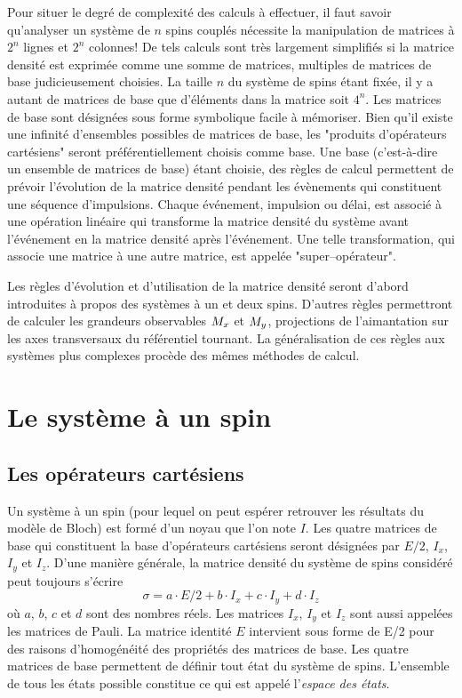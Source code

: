 Pour situer le degré de complexité des calculs à effectuer, il faut savoir qu'analyser un 
système de $n$ spins couplés nécessite la manipulation de matrices à $2^n$ lignes et $2^n$ 
colonnes! 
De tels calculs sont très largement simplifiés si la matrice densité est 
exprimée comme une somme de matrices, multiples de matrices de base judicieusement 
choisies. 
La taille $n$ du système de spins étant fixée, il y a autant
de matrices de base que d'éléments dans la matrice soit $4^n$. 
Les matrices de base sont désignées sous forme symbolique facile à mémoriser. 
Bien qu'il existe une infinité d'ensembles possibles de matrices de base,
les "produits d'opérateurs cartésiens" seront préférentiellement choisis comme base.
Une base (c'est-à-dire un ensemble de matrices de base) étant choisie, 
des règles de calcul permettent de prévoir l'évolution de la 
matrice densité pendant les évènements qui constituent une séquence d'impulsions.
Chaque événement, impulsion ou délai, est associé à une opération linéaire
qui transforme la matrice densité du système avant l'événement en la matrice densité
après l'événement.
Une telle transformation, qui associe une matrice à une autre matrice, 
est appelée "super--opérateur".

Les règles d'évolution et d'utilisation de la matrice densité seront d'abord
introduites à propos des systèmes à un et deux spins.
D'autres règles permettront de calculer les grandeurs observables
$M_x$ et $M_y$, projections de l'aimantation sur les axes
transversaux du référentiel tournant.
La généralisation de ces règles aux systèmes plus 
complexes procède des mêmes méthodes de calcul. 

\section{Le système à un spin}
\subsection{Les opérateurs cartésiens}
Un système à un spin (pour lequel on peut espérer retrouver les résultats du modèle de 
Bloch) est formé d'un noyau que l'on note $I$.
Les quatre matrices de base qui constituent la base d'opérateurs cartésiens
seront désignées par $E/2$, $I_x$, $I_y$ et $I_z$.
D'une manière générale, la matrice densité du système de spins considéré peut toujours s'écrire
\begin{equation}
\sigma = a \cdot E/2 + b \cdot I_x + c \cdot I_y + d \cdot I_z
\end{equation}
où $a$, $b$, $c$ et $d$ sont des nombres réels.
Les matrices $I_x$, $I_y$ et $I_z$ sont aussi appelées les matrices de Pauli.
La matrice identité $E$ intervient sous forme de E/2 pour des raisons
d'homogénéité des propriétés des matrices de base.
Les quatre matrices de base permettent de définir tout état du système de spins.
L'ensemble de tous les états possible constitue ce qui est appelé l'\emph{espace des états}.

